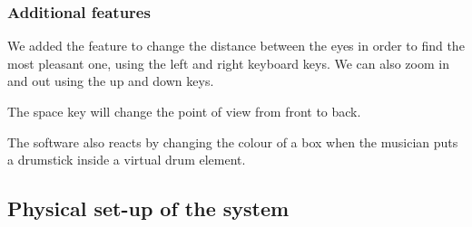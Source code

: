\subsubsection{Additional features}
We added the feature to change the distance between the eyes in order to find the most pleasant one, using the left and right keyboard keys.
We can also zoom in and out using the up and down keys.

The space key will change the point of view from front to back.

The software also reacts by changing the colour of a box when the musician puts a drumstick inside a virtual drum element.

\subsection{Physical set-up of the system}

